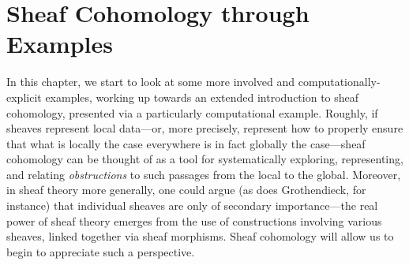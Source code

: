 \documentclass[11pt]{book}
\theoremstyle{definition}
\theoremstyle{definition}
\theoremstyle{definition}
\theoremstyle{theorem}
\theoremstyle{definition}
\begin{document}
\chapter{Sheaf Cohomology through Examples} 
In this chapter, we start to look at some more involved and computationally-explicit examples, working up towards an extended introduction to sheaf cohomology, presented via a particularly computational example. Roughly, if sheaves represent local data---or, more precisely, represent how to properly ensure that what is locally the case everywhere is in fact globally the case---sheaf cohomology can be thought of as a tool for systematically exploring, representing, and relating \textit{obstructions} to such passages from the local to the global. Moreover, in sheaf theory more generally, one could argue (as does Grothendieck, for instance) that individual sheaves are only of secondary importance---the real power of sheaf theory emerges from the use of constructions involving various sheaves, linked together via sheaf morphisms. Sheaf cohomology will allow us to begin to appreciate such a perspective. 
\end{document}
